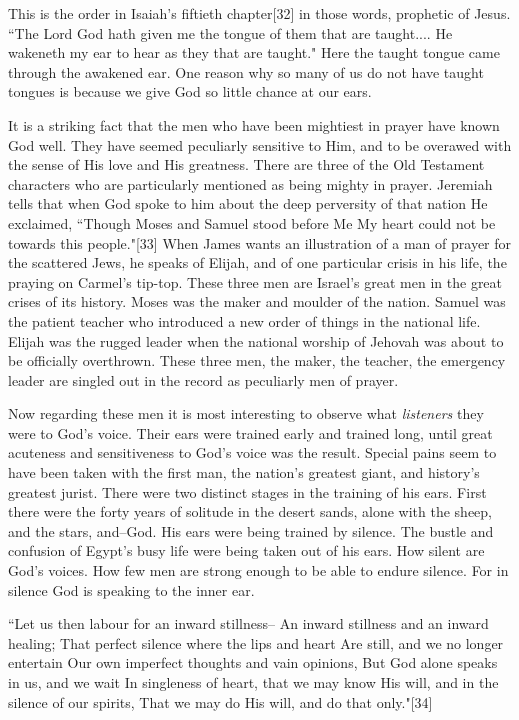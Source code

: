 This is the order in Isaiah's fiftieth chapter[32] in those words,
prophetic of Jesus. ``The Lord God hath given me the tongue of them that
are taught.... He wakeneth my ear to hear as they that are taught." Here
the taught tongue came through the awakened ear. One reason why so many of
us do not have taught tongues is because we give God so little chance at
our ears.

It is a striking fact that the men who have been mightiest in prayer have
known God well. They have seemed peculiarly sensitive to Him, and to be
overawed with the sense of His love and His greatness. There are three of
the Old Testament characters who are particularly mentioned as being
mighty in prayer. Jeremiah tells that when God spoke to him about the deep
perversity of that nation He exclaimed, ``Though Moses and Samuel stood
before Me My heart could not be towards this people."[33] When James wants
an illustration of a man of prayer for the scattered Jews, he speaks of
Elijah, and of one particular crisis in his life, the praying on Carmel's
tip-top. These three men are Israel's great men in the great crises of its
history. Moses was the maker and moulder of the nation. Samuel was the
patient teacher who introduced a new order of things in the national life.
Elijah was the rugged leader when the national worship of Jehovah was
about to be officially overthrown. These three men, the maker, the
teacher, the emergency leader are singled out in the record as peculiarly
men of prayer.

Now regarding these men it is most interesting to observe what \textit{listeners}
they were to God's voice. Their ears were trained early and trained long,
until great acuteness and sensitiveness to God's voice was the result.
Special pains seem to have been taken with the first man, the nation's
greatest giant, and history's greatest jurist. There were two distinct
stages in the training of his ears. First there were the forty years of
solitude in the desert sands, alone with the sheep, and the stars,
and--God. His ears were being trained by silence. The bustle and confusion
of Egypt's busy life were being taken out of his ears. How silent are
God's voices. How few men are strong enough to be able to endure silence.
For in silence God is speaking to the inner ear.

    ``Let us then labour for an inward stillness--
    An inward stillness and an inward healing;
    That perfect silence where the lips and heart
    Are still, and we no longer entertain
    Our own imperfect thoughts and vain opinions,
    But God alone speaks in us, and we wait
    In singleness of heart, that we may know
    His will, and in the silence of our spirits,
    That we may do His will, and do that only."[34]

